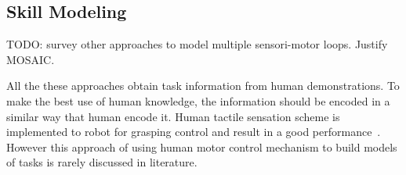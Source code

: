 


\subsection{Skill Modeling}
TODO: survey other approaches to model multiple sensori-motor loops. Justify MOSAIC.

All the these approaches obtain task information from human demonstrations. To make the best use of human knowledge, the information should be encoded in a similar way that human encode it. Human tactile sensation scheme is implemented to robot for grasping control and result in a good performance~\cite{romano2011human}. However this approach of using human motor control mechanism to build models of tasks is rarely discussed in literature.


